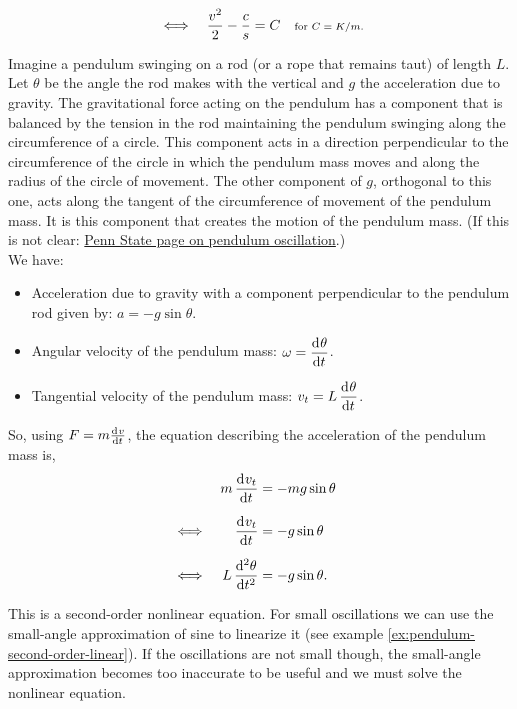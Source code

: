 \documentclass[../MathsNotesBase.tex]{subfiles}
\begin{document}
{\begin{exe}
{\begin{align*}
					&\iff & \frac{v^2}{2} - \frac{c}{s} &= C &\text{\scriptsize{for ${ C = K/m }$.}} \\
				\end{align*}
			}
			\biggerskip
			\item{
				Imagine a pendulum swinging on a rod (or a rope that remains taut) of length $L$. Let $\theta$ be the angle the rod makes with the vertical and $g$ the acceleration due to gravity. The gravitational force acting on the pendulum has a component that is balanced by the tension in the rod maintaining the pendulum swinging along the circumference of a circle. This component acts in a direction perpendicular to the circumference of the circle in which the pendulum mass moves and along the radius of the circle of movement. The other component of $g$, orthogonal to this one, acts along the tangent of the circumference of movement of the pendulum mass. It is this component that creates the motion of the pendulum mass. (If this is not clear: \href{https://www.acs.psu.edu/drussell/Demos/Pendulum/Pendulum.html}{Penn State page on pendulum oscillation}.)\\
				
				We have:
				\begin{itemize}
					\item{Acceleration due to gravity with a component perpendicular to the pendulum rod given by: ${ a = - g \sin\theta }$.}
					\item{Angular velocity of the pendulum mass: ${ \omega = \dod{\theta}{t} }$.}
					\item{Tangential velocity of the pendulum mass: ${ v_t = L \dod{\theta}{t} }$.}
				\end{itemize}
				
				So, using ${ F = m\od{v}{t} }$, the equation describing the acceleration of the pendulum mass is,
				\begin{align*}
					&& m\dod{v_t}{t} &= - m g \sin\theta \nn
					&\iff & \dod{v_t}{t} &= - g \sin\theta &\sidecomment{} \nn
					&\iff &  L \dod[2]{\theta}{t} &= - g \sin\theta.
				\end{align*}
				
				This is a second-order nonlinear equation. For small oscillations we can use the small-angle approximation of sine to linearize it (see example \ref{ex:pendulum-second-order-linear}). If the oscillations are not small though, the small-angle approximation becomes too inaccurate to be useful and we must solve the nonlinear equation.\\
				
}
\end{exe}}
\end{document}
